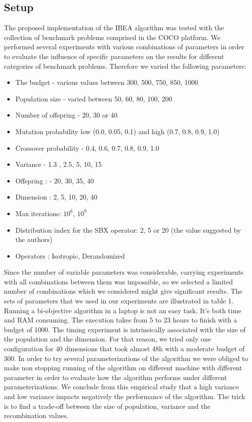 \documentclass{sig-alternate}
\begin{document}
\subsection{Setup}
The proposed implementation of the IBEA algorithm was tested with the collection of benchmark problems comprised in the COCO platform. We performed several experiments with various combinations of parameters in order to evaluate the influence of specific parameters on the results for different categories of benchmark problems. Therefore we varied the following parameters:
\begin{itemize}
\item The budget - various values between 300, 500, 750, 850, 1000
\item Population size - varied between 50, 60, 80, 100, 200
\item Number of offspring - 20, 30 or 40
\item Mutation probability low (0.0, 0.05, 0.1) and high (0.7, 0.8, 0.9, 1.0)
\item Crossover probability - 0.4, 0.6, 0.7, 0.8, 0.9, 1.0
\item Variance - 1.3 , 2.5, 5, 10, 15
\item Offspring : - 20, 30, 35, 40
\item Dimension : 2, 5, 10, 20, 40
\item Max iterations: $10^6$, $10^9$
\item Distribution index for the SBX operator: 2, 5 or 20 (the value suggested by the authors)
\item Operators : Isotropic, Derandomized
\end{itemize}

Since the number of variable parameters was considerable, carrying experiments with all combinations between them was impossible, so we selected a limited number of combinations which we considered might give significant results. The sets of parameters that we used in our experiments are illustrated in table 1.  
Running a bi-objective algorithm in a laptop is not an easy task. It's both time and RAM consuming.  The execution takes from 5 to 23 hours to finish with a budget of 1000. The timing experiment  is intrinsically associated with the size of the population and the dimension. 
For that reason, we tried only one configuration for 40 dimensions that took almost 48h  with a moderate budget of 300.  
In order to try several parameterizations of the algorithm we  were obliged to make non stopping running of the algorithm on different machine with different parameter in order to evaluate how  the algorithm performs under different parameterizations. We conclude from this empirical study that a high variance and low variance impacts negatively the performance of the algorithm. The trick is to find a trade-off between the size of population, variance and the recombination values.
\end{document}
